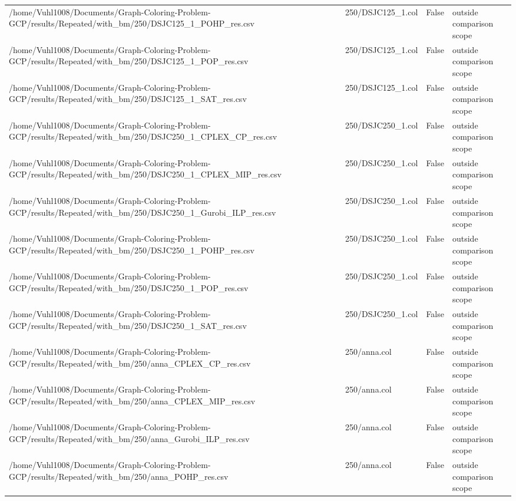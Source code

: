 \begin{table}[htbp]
\begin{tabular}{llll}
/home/Vuhl1008/Documents/Graph-Coloring-Problem-GCP/results/Repeated/with\_bm/250/DSJC125\_1\_POHP\_res.csv & 250/DSJC125\_1.col & False & outside comparison scope \\
/home/Vuhl1008/Documents/Graph-Coloring-Problem-GCP/results/Repeated/with\_bm/250/DSJC125\_1\_POP\_res.csv & 250/DSJC125\_1.col & False & outside comparison scope \\
/home/Vuhl1008/Documents/Graph-Coloring-Problem-GCP/results/Repeated/with\_bm/250/DSJC125\_1\_SAT\_res.csv & 250/DSJC125\_1.col & False & outside comparison scope \\
/home/Vuhl1008/Documents/Graph-Coloring-Problem-GCP/results/Repeated/with\_bm/250/DSJC250\_1\_CPLEX\_CP\_res.csv & 250/DSJC250\_1.col & False & outside comparison scope \\
/home/Vuhl1008/Documents/Graph-Coloring-Problem-GCP/results/Repeated/with\_bm/250/DSJC250\_1\_CPLEX\_MIP\_res.csv & 250/DSJC250\_1.col & False & outside comparison scope \\
/home/Vuhl1008/Documents/Graph-Coloring-Problem-GCP/results/Repeated/with\_bm/250/DSJC250\_1\_Gurobi\_ILP\_res.csv & 250/DSJC250\_1.col & False & outside comparison scope \\
/home/Vuhl1008/Documents/Graph-Coloring-Problem-GCP/results/Repeated/with\_bm/250/DSJC250\_1\_POHP\_res.csv & 250/DSJC250\_1.col & False & outside comparison scope \\
/home/Vuhl1008/Documents/Graph-Coloring-Problem-GCP/results/Repeated/with\_bm/250/DSJC250\_1\_POP\_res.csv & 250/DSJC250\_1.col & False & outside comparison scope \\
/home/Vuhl1008/Documents/Graph-Coloring-Problem-GCP/results/Repeated/with\_bm/250/DSJC250\_1\_SAT\_res.csv & 250/DSJC250\_1.col & False & outside comparison scope \\
/home/Vuhl1008/Documents/Graph-Coloring-Problem-GCP/results/Repeated/with\_bm/250/anna\_CPLEX\_CP\_res.csv & 250/anna.col & False & outside comparison scope \\
/home/Vuhl1008/Documents/Graph-Coloring-Problem-GCP/results/Repeated/with\_bm/250/anna\_CPLEX\_MIP\_res.csv & 250/anna.col & False & outside comparison scope \\
/home/Vuhl1008/Documents/Graph-Coloring-Problem-GCP/results/Repeated/with\_bm/250/anna\_Gurobi\_ILP\_res.csv & 250/anna.col & False & outside comparison scope \\
/home/Vuhl1008/Documents/Graph-Coloring-Problem-GCP/results/Repeated/with\_bm/250/anna\_POHP\_res.csv & 250/anna.col & False & outside comparison scope \\

\end{tabular}
\end{table}
